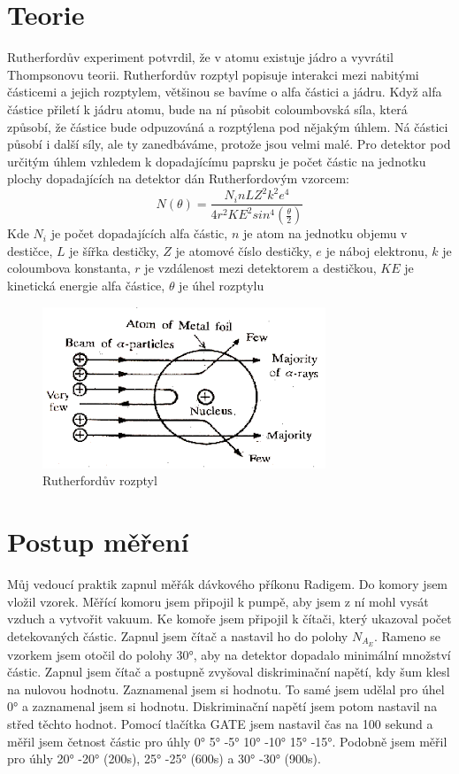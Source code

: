 \documentclass{article}
\begin{document}
\section{Teorie}
Rutherfordův experiment potvrdil, že v atomu existuje jádro a vyvrátil Thompsonovu teorii.
Rutherfordův rozptyl popisuje interakci mezi nabitými částicemi a jejich rozptylem, většinou se bavíme o alfa částici a jádru. Když alfa částice přiletí k jádru atomu, bude na ní působit coloumbovská síla, která způsobí, že částice bude odpuzováná a rozptýlena pod nějakým úhlem. Ná částici působí i další síly, ale ty zanedbáváme, protože jsou velmi malé.
Pro detektor pod určitým úhlem vzhledem k dopadajícímu paprsku je počet částic na jednotku plochy dopadajících na detektor dán Rutherfordovým vzorcem:
\begin{equation}
  N(\theta) = \frac{N_{i}n L Z^{2} k^{2} e^{4}}{4 r^{2} K E^{2} sin^{4}(\frac{\theta}{2})}
\end{equation}
Kde $N_{i}$ je počet dopadajících alfa částic,
$n$ je atom na jednotku objemu v destičce,
$L$ je šířka destičky,
$Z$ je atomové číslo destičky,
$e$ je náboj elektronu,
$k$ je coloumbova konstanta,
$r$ je vzdálenost mezi detektorem a destičkou,
$KE$ je kinetická energie alfa částice,
$\theta$ je úhel rozptylu
\begin{figure}[h]
  \includegraphics[scale=0.8]{data/ruther.png}
  \caption{Rutherfordův rozptyl}
\end{figure}
\section{Postup měření}
Můj vedoucí praktik zapnul měřák dávkového příkonu Radigem.
Do komory jsem vložil vzorek.
Měřící komoru jsem připojil k pumpě, aby jsem z ní mohl vysát vzduch a vytvořit vakuum.
Ke komoře jsem připojil k čítači, který ukazoval počet detekovaných částic.
Zapnul jsem čítač a nastavil ho do polohy $N_{A_E}$.
Rameno se vzorkem jsem otočil do polohy 30°, aby na detektor dopadalo minimální množství částic.
Zapnul jsem čítač a postupně zvyšoval diskriminační napětí, kdy šum klesl na nulovou hodnotu.
Zaznamenal jsem si hodnotu.
To samé jsem udělal pro úhel 0° a zaznamenal jsem si hodnotu.
Diskriminační napětí jsem potom nastavil na střed těchto hodnot.
Pomocí tlačítka GATE jsem nastavil čas na 100 sekund a měřil jsem četnost částic pro úhly 0° 5° -5° 10° -10° 15° -15°.
Podobně jsem měřil pro úhly 20° -20° (200s), 25° -25° (600s) a 30° -30° (900s).
\newpage
\end{document}
